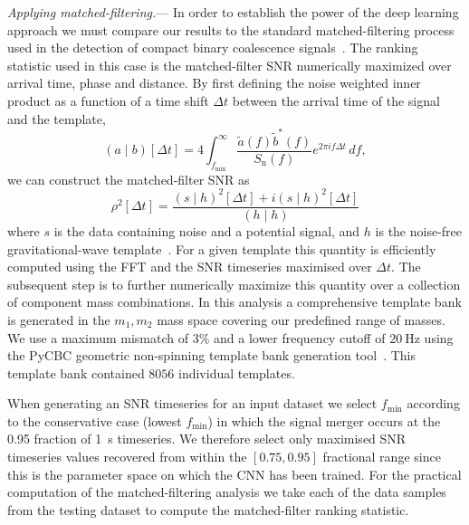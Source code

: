 \documentclass[%
showpacs,
 amsmath,amssymb,
 aps,
 twocolumn,
 prl,
 reprint,
floatfix,
]{revtex4-1}
\begin{document}
%
%
\textit{Applying matched-filtering.}---
%
%
In order to establish the power of the deep learning approach we must compare
our results to the standard matched-filtering process used in the detection of
compact binary coalescence
signals~\cite{PhysRevD.85.122006,2013PhRvD..87b4033B}. The ranking statistic
used in this case is the matched-filter \ac{SNR} numerically maximized over
arrival time, phase and distance. By first defining the noise weighted inner
product as a function of a time shift $\Delta t$ between the arrival time of
the signal and the template,
%
%
\begin{equation}\label{eq:inner}
(a\mid b)[\Delta t] =
4\int_{f_{\mathrm{min}}}^{\infty}\frac{\tilde{a}(f)\tilde{b}^{*}(f)}{S_{\mathrm{n}}(f)}e^{2\pi i
f\Delta t}\,df,
\end{equation}
%
we can construct the matched-filter \ac{SNR} as 
%
\begin{equation}
\rho^{2}[\Delta t]=\frac{(s\mid h)^{2}[\Delta t] + i(s\mid h)^{2}[\Delta t]}{(h\mid h)}
\end{equation}
%
where $s$ is the data containing noise and a potential signal, and $h$ is the
noise-free gravitational-wave template~\cite{0264-9381-23-18-002}. For a given template this quantity is
efficiently computed using the \ac{FFT} and the \ac{SNR} timeseries maximised
over $\Delta t$. The subsequent step is to further numerically maximize this
quantity over a collection of component mass combinations. In this analysis a
comprehensive template bank is generated in the $m_{1},m_{2}$ mass space
covering our predefined range of masses. We use a maximum mismatch of $3\%$ and
a lower frequency cutoff of $20~\mathrm{Hz}$ using the PyCBC geometric
non-spinning template bank generation
tool~\cite{pycbc-software,0264-9381-33-21-215004}. This template bank contained
$8056$ individual templates. 

%
%
When generating an \ac{SNR} timeseries for an input dataset we select
$f_{\mathrm{min}}$ according to the conservative case (lowest
$f_{\mathrm{min}}$) in which the signal merger occurs at the 0.95 fraction of
1~s timeseries. We therefore select only maximised \ac{SNR} timeseries
values recovered from within the $[0.75,0.95]$ fractional range since this is
the parameter space on which the \ac{CNN} has been trained. For the practical
computation of the matched-filtering analysis we take each of the data samples
from the testing dataset to compute the matched-filter ranking statistic.
\end{document}
